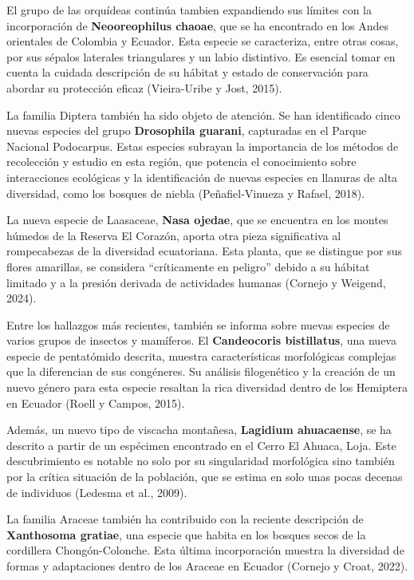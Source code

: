 \documentclass[
  letterpaper,
  DIV=11,
  numbers=noendperiod,
  oneside]{scrreprt}
\begin{document}
El grupo de las orquídeas continúa tambien expandiendo sus límites con
la incorporación de \textbf{Neooreophilus chaoae}, que se ha encontrado
en los Andes orientales de Colombia y Ecuador. Esta especie se
caracteriza, entre otras cosas, por sus sépalos laterales triangulares y
un labio distintivo. Es esencial tomar en cuenta la cuidada descripción
de su hábitat y estado de conservación para abordar su protección eficaz
(Vieira-Uribe y Jost, 2015).

La familia Diptera también ha sido objeto de atención. Se han
identificado cinco nuevas especies del grupo \textbf{Drosophila
guarani}, capturadas en el Parque Nacional Podocarpus. Estas especies
subrayan la importancia de los métodos de recolección y estudio en esta
región, que potencia el conocimiento sobre interacciones ecológicas y la
identificación de nuevas especies en llanuras de alta diversidad, como
los bosques de niebla (Peñafiel-Vinueza y Rafael, 2018).

La nueva especie de Laasaceae, \textbf{Nasa ojedae}, que se encuentra en
los montes húmedos de la Reserva El Corazón, aporta otra pieza
significativa al rompecabezas de la diversidad ecuatoriana. Esta planta,
que se distingue por sus flores amarillas, se considera ``críticamente
en peligro'' debido a su hábitat limitado y a la presión derivada de
actividades humanas (Cornejo y Weigend, 2024).

Entre los hallazgos más recientes, también se informa sobre nuevas
especies de varios grupos de insectos y mamíferos. El
\textbf{Candeocoris bistillatus}, una nueva especie de pentatómido
descrita, muestra características morfológicas complejas que la
diferencian de sus congéneres. Su análisis filogenético y la creación de
un nuevo género para esta especie resaltan la rica diversidad dentro de
los Hemiptera en Ecuador (Roell y Campos, 2015).

Además, un nuevo tipo de viscacha montañesa, \textbf{Lagidium
ahuacaense}, se ha descrito a partir de un espécimen encontrado en el
Cerro El Ahuaca, Loja. Este descubrimiento es notable no solo por su
singularidad morfológica sino también por la crítica situación de la
población, que se estima en solo unas pocas decenas de individuos
(Ledesma et al., 2009).

La familia Araceae también ha contribuido con la reciente descripción de
\textbf{Xanthosoma gratiae}, una especie que habita en los bosques secos
de la cordillera Chongón-Colonche. Esta última incorporación muestra la
diversidad de formas y adaptaciones dentro de los Araceae en Ecuador
(Cornejo y Croat, 2022).
\end{document}
